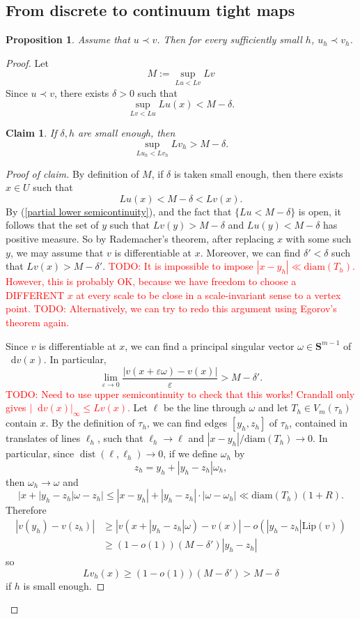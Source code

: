 \documentclass[reqno,11pt]{amsart}
\newcommand{\Sph}{\mathbf S}
\newcommand*\dif{\mathop{}\!\mathrm{d}}
\DeclareMathOperator{\dist}{dist}
\newcommand{\diam}{\mathrm{diam}}
\newcommand{\Lip}{\mathrm{Lip}}
\newtheorem{proposition}[theorem]{Proposition}
\newtheorem{claim}{Claim}[theorem]
\theoremstyle{definition}
\numberwithin{equation}{section}
\newcommand\todo[1]{\textcolor{red}{TODO: #1}}
\begin{document}
\subsection{From discrete to continuum tight maps}
\begin{proposition}
Assume that $u \prec v$.
Then for every sufficiently small $h$, $u_h \prec v_h$.
\end{proposition}
\begin{proof}
Let 
$$M := \sup_{Lu < Lv} Lv$$
Since $u \prec v$, there exists $\delta > 0$ such that
$$\sup_{Lv < Lu} Lu(x) < M - \delta.$$

\begin{claim}
If $\delta, h$ are small enough, then 
$$\sup_{Lu_h < Lv_h} Lv_h > M - \delta.$$
\end{claim}
\begin{proof}[Proof of claim]
By definition of $M$, if $\delta$ is taken small enough, then there exists $x \in U$ such that
$$Lu(x) < M - \delta < Lv(x).$$
By (\ref{partial lower semicontinuity}), and the fact that $\{Lu < M - \delta\}$ is open, it follows that the set of $y$ such that $Lv(y) > M - \delta$ and $Lu(y) < M - \delta$ has positive measure.
So by Rademacher's theorem, after replacing $x$ with some such $y$, we may assume that $v$ is differentiable at $x$.
Moreover, we can find $\delta' < \delta$ such that $Lv(x) > M - \delta'$.
\todo{It is impossible to impose $|x - y_h| \ll \diam(T_h)$. However, this is probably OK, because we have freedom to choose a DIFFERENT $x$ at every scale to be close in a scale-invariant sense to a vertex point.}
\todo{Alternatively, we can try to redo this argument using Egorov's theorem again.}

Since $v$ is differentiable at $x$, we can find a principal singular vector $\omega \in \Sph^{m - 1}$ of $\dif v(x)$.
In particular,
$$\lim_{\varepsilon \to 0} \frac{|v(x + \varepsilon \omega) - v(x)|}{\varepsilon} > M - \delta'.$$
\todo{Need to use upper semicontinuity to check that this works! Crandall only gives $|\dif v(x)|_\infty \leq Lv(x)$.}
Let $\ell$ be the line through $\omega$ and let $T_h \in V_m(\tau_h)$ contain $x$.
By the definition of $\tau_h$, we can find edges $[y_h, z_h]$ of $\tau_h$, contained in translates of lines $\ell_h$, such that $\ell_h \to \ell$ and $|x - y_h|/\diam(T_h) \to 0$.
In particular, since $\dist(\ell, \ell_h) \to 0$, if we define $\omega_h$ by 
$$z_h = y_h + |y_h - z_h| \omega_h,$$
then $\omega_h \to \omega$ and
$$|x + |y_h - z_h| \omega - z_h| \leq |x - y_h| + |y_h - z_h| \cdot |\omega - \omega_h| \ll \diam(T_h) (1 + R).$$
Therefore 
\begin{align*}
|v(y_h) - v(z_h)| &\geq |v(x + |y_h - z_h| \omega) - v(x)| - o(|y_h - z_h| \Lip(v)) \\
&\geq (1 - o(1))(M - \delta') |y_h - z_h|
\end{align*}
so 
$$Lv_h(x) \geq (1 - o(1))(M - \delta') > M - \delta$$
if $h$ is small enough.


\end{proof}
\end{proof}
\end{document}
